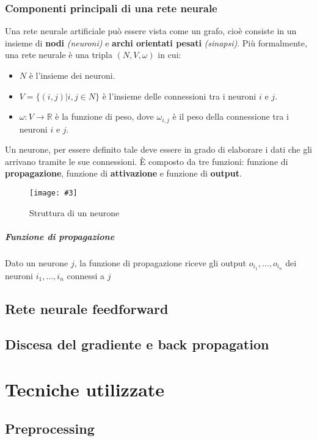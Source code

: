 \documentclass[12pt, twoside, letterpaper]{report}
\newcommand{\img}[3] {
	\begin{figure}[h]
		\caption{#1}
		\centering
		\texttt{[image: \#3]}\\
	\end{figure}
}
\begin{document}
			
		\subsection{Componenti principali di una rete neurale}
			Una rete neurale artificiale può essere vista come un grafo, cioè consiste in un insieme di \textbf{nodi} \textit{(neuroni)} e \textbf{archi orientati pesati} \textit{(sinapsi)}. Più formalmente, una rete neurale è una tripla $(N,V, \omega)$ in cui:
			\begin{itemize}
				\item $N$ è l'insieme dei neuroni.
				\item $V = \{(i,j) | i,j \in N\}$ è l'insieme delle connessioni tra i neuroni $i$ e $j$.
				\item $\omega: V \rightarrow \mathbb{R}$ è la funzione di peso, dove $\omega_{i,j}$ è il peso della connessione tra i neuroni $i$ e $j$.
			\end{itemize}
			Un neurone, per essere definito tale deve essere in grado di elaborare i dati che gli arrivano tramite le sue connessioni. È composto da tre funzioni: funzione di \textbf{propagazione}, funzione di \textbf{attivazione} e funzione di \textbf{output}. 
			
			\img{Struttura di un neurone}{0.4}{neurone.png}
			
			 \paragraph{Funzione di propagazione} Dato un neurone $j$, la funzione di propagazione riceve gli output $o_{i_1}, \dots, o_{i_n}$ dei neuroni $i_1, \dots, i_n$ connessi a $j$
			
		\section{Rete neurale feedforward}
		\section{Discesa del gradiente e back propagation}
		
	\chapter{Tecniche utilizzate}
		\section{Preprocessing}
\end{document}

